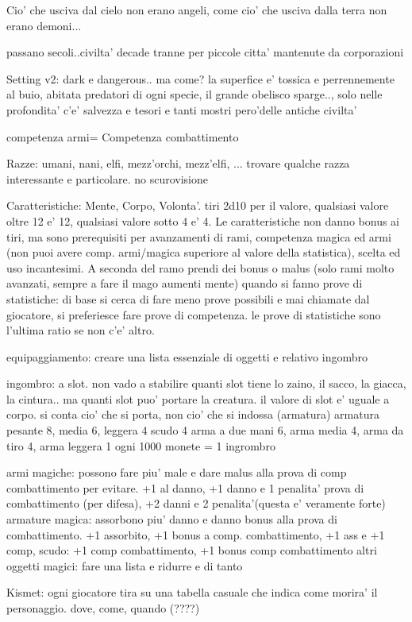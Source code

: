 \documentclass[12pt,a4paper,twoside,openany,twocolumn]{book}
\begin{document}
Cio' che usciva dal cielo non erano angeli, come cio' che usciva dalla terra non erano demoni...

passano secoli..civilta' decade tranne per piccole citta' mantenute da corporazioni


Setting v2: dark e dangerous.. ma come?
la superfice e'  tossica e perrennemente al buio, abitata predatori di ogni specie, il grande obelisco sparge.., solo nelle profondita' c'e' salvezza e tesori e tanti mostri pero'delle antiche civilta'

competenza armi= Competenza combattimento


Razze: umani, nani, elfi, mezz'orchi, mezz'elfi, ... trovare qualche razza interessante e particolare. no scurovisione

Caratteristiche: Mente, Corpo, Volonta'. tiri 2d10 per il valore, qualsiasi valore oltre 12 e' 12, qualsiasi valore sotto 4 e' 4.
Le caratteristiche non danno bonus ai tiri, ma sono prerequisiti per avanzamenti di rami, competenza magica ed armi (non puoi avere comp. armi/magica superiore al valore della statistica), scelta ed uso incantesimi. A seconda del ramo prendi dei bonus o malus (solo rami molto avanzati, sempre a fare il mago aumenti mente)
quando si fanno prove di statistiche: di base si cerca di fare meno prove possibili e mai chiamate dal giocatore, si preferiesce fare prove di competenza. le prove di statistiche sono l'ultima ratio se non c'e' altro.


equipaggiamento: creare una lista essenziale di oggetti e relativo ingombro

ingombro: a slot. non vado a stabilire quanti slot tiene lo zaino, il sacco, la giacca, la cintura.. ma quanti slot puo' portare la creatura. il valore di slot e' uguale a corpo. si conta cio' che si porta, non cio' che si indossa (armatura)
armatura pesante 8, media 6, leggera 4
scudo 4
arma a due mani 6, arma media 4, arma da tiro 4, arma leggera 1
ogni 1000 monete = 1 ingrombro

armi magiche: possono fare piu' male e dare malus alla prova di comp combattimento per evitare. +1 al danno, +1 danno e 1 penalita' prova di combattimento (per difesa), +2 danni e 2 penalita'(questa e' veramente forte)
armature magica: assorbono piu' danno e danno bonus alla prova di combattimento. +1 assorbito, +1 bonus a comp. combattimento, +1 ass e +1 comp, 
scudo: +1 comp combattimento, +1 bonus comp combattimento
altri oggetti magici: fare una lista e ridurre e di tanto

Kismet: ogni giocatore tira su una tabella casuale che indica come morira' il personaggio. dove, come, quando (????)
\end{document}
